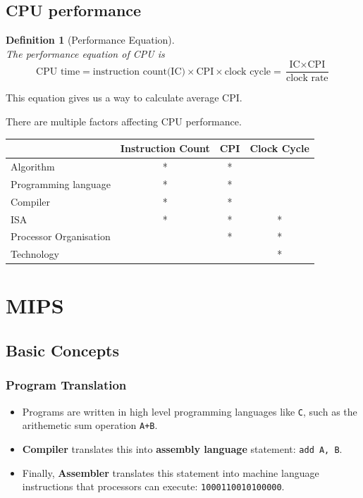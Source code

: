\documentclass[12pt]{article}
\newtheorem{definition}{Definition}[section]
\theoremstyle{definition}
\begin{document}
\subsection{CPU performance}
\begin{definition}[Performance Equation]
\hfill\\\normalfont The performance equation of CPU is
\[
\text{CPU time} = \text{instruction count(IC)}\times\text{CPI}\times\text{clock cycle} = \frac{\text{IC}\times\text{CPI}}{\text{clock rate}}
\]
\end{definition}
This equation gives us a way to calculate average CPI.

There are multiple factors affecting CPU performance.
\begin{table}[h]
\centering
\begin{tabular}{|l|c|c|c|}
\hline
&Instruction Count&CPI&Clock Cycle\\\hline
Algorithm&*&*&\\\hline
Programming language&*&*&\\\hline
Compiler&*&*&\\\hline
ISA&*&*&*\\\hline
Processor Organisation&&*&*\\\hline
Technology&&&*\\\hline
\end{tabular}
\end{table}
\clearpage
\section{MIPS}
\subsection{Basic Concepts}
\subsubsection{Program Translation}
\begin{itemize}
\item Programs are written in high level programming languages like \texttt{C}, such as the arithemetic sum operation \texttt{A+B}.
\item \textbf{Compiler} translates this into \textbf{assembly language} statement: \texttt{add A, B}.
\item Finally, \textbf{Assembler} translates this statement into machine language instructions that processors can execute: \texttt{1000110010100000}.
\end{itemize}
\end{document}
